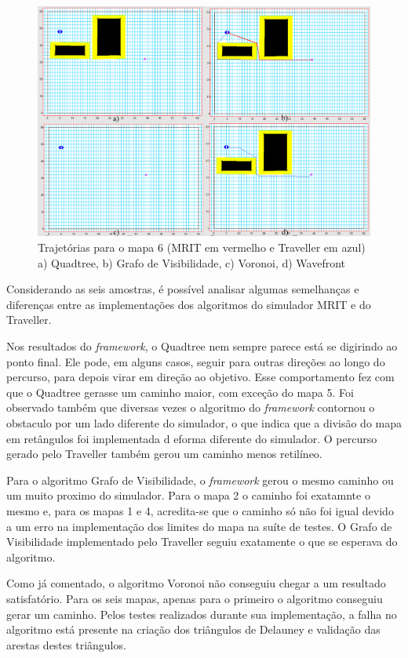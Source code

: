\begin{figure}[H]
	\centering
	\label{fig44}
		\includegraphics[keepaspectratio=true,scale=0.3]{figuras/mapa6.jpg}
	\caption{Trajetórias para o mapa 6 (MRIT em vermelho e Traveller em azul) a) Quadtree, b) Grafo de Visibilidade, c) Voronoi, d) Wavefront}
\end{figure}

Considerando as seis amostras, é possível analisar algumas semelhanças e diferenças entre as implementações dos algoritmos do simulador MRIT e do Traveller.

Nos resultados do \textit{framework}, o Quadtree nem sempre parece está se digirindo ao ponto final. Ele pode, em alguns casos, seguir para outras direções ao longo do percurso, para depois virar em direção ao objetivo. Esse comportamento fez com que o Quadtree gerasse um caminho maior, com exceção do mapa 5. Foi observado também que diversas vezes o algoritmo do \textit{framework} contornou o obstaculo por um lado diferente do simulador, o que indica que a divisão do mapa em retângulos foi implementada d eforma diferente do simulador. O percurso gerado pelo Traveller também gerou um caminho menos retilíneo.

Para o algoritmo Grafo de Visibilidade, o \textit{framework} gerou o mesmo caminho ou um muito proximo do simulador. Para o mapa 2 o caminho foi exatamnte o mesmo e, para os mapas 1 e 4, acredita-se que o caminho só não foi igual devido a um erro na implementação dos limites do mapa na suíte de testes. O Grafo de Visibilidade implementado pelo Traveller seguiu exatamente o que se esperava do algoritmo.

Como já comentado, o algoritmo Voronoi não conseguiu chegar a um resultado satisfatório. Para os seis mapas, apenas para o primeiro o algoritmo conseguiu gerar um caminho. Pelos testes realizados durante sua implementação, a falha no algoritmo está presente na criação dos triângulos de Delauney e validação das arestas destes triângulos.

